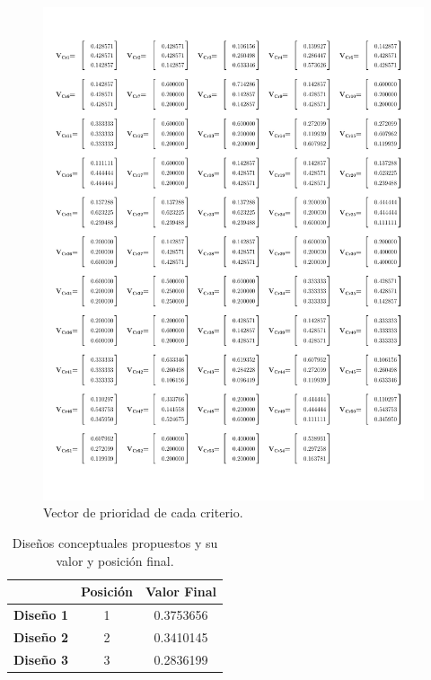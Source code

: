 \newpage
\begin{figure}[H]
	\centering
	\includegraphics[width=15cm]{imagenes/54VectoresDePrioridadEx}
	\caption{Vector de prioridad de cada criterio.}
	\label{fig:54VectoresDePrioridadEx}
\end{figure}

\newpage
\begin{table}[H]
	\centering
	\caption{Diseños conceptuales propuestos y su valor y posición final.}
	\begin{tabular}{ccc}
		\hline
		& \textbf{Posición} & \textbf{Valor Final} \\
		\hline
		\hline
		\textbf{Diseño 1} & 1     & 0.3753656 \\
		\textbf{Diseño 2} & 2     & 0.3410145 \\
		\textbf{Diseño 3} & 3     & 0.2836199 \\
		\hline
	\end{tabular}%
	\label{tab:resultado AHP1}%
\end{table}%

